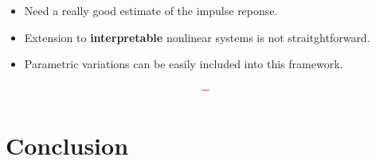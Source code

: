 \documentclass[aspectratio=169, usenames, dvipsnames]{beamer}
\begin{document}
\begin{frame}
  \vfill

  \begin{minipage}{.68\textwidth}
    \begin{itemize}
      \item Need a really good estimate of the impulse reponse.

      \bigskip

      \item Extension to \textbf{interpretable} nonlinear systems is not straitghtforward.

      \bigskip

      \item Parametric variations can be easily included into this framework.

    \end{itemize}
  \end{minipage}%
  \hfill
  \begin{minipage}{.28\textwidth}
    \centering
    \Huge
    \[
    \color{red} \bm{-}
    \]
  \end{minipage}

  \vfill
\end{frame}


\section{Conclusion}
\begin{frame}
  \sectionpage
\end{frame}

\begin{frame}
  \vfill

  \vfill
\end{frame}
\end{document}
